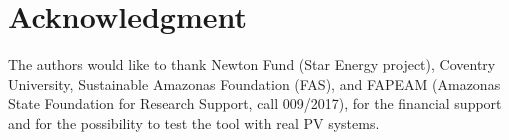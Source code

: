 \documentclass[journal]{IEEEtran}
\begin{document}


%





\section*{Acknowledgment}
The authors would like to thank Newton Fund (Star Energy project), Coventry University, Sustainable Amazonas Foundation (FAS), and FAPEAM (Amazonas State Foundation for Research Support, call 009/2017), for the financial support and for the possibility to test the tool with real PV systems.
\end{document}
